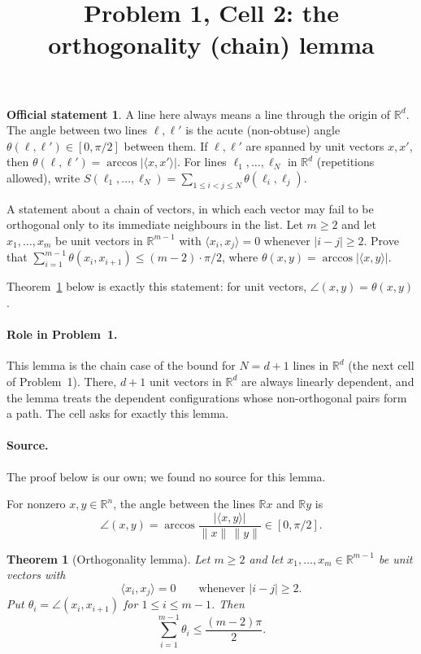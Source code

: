 \documentclass[11pt]{article}
\title{Problem 1, Cell 2: the orthogonality (chain) lemma}
\author{}
\date{}
\newtheorem{theorem}{Theorem}
\theoremstyle{remark}
\theoremstyle{definition}
\newtheorem*{statement}{Official statement}
\newcommand{\ip}[2]{\langle #1,#2\rangle}
\begin{document}
\maketitle

\begin{statement}
A line here always means a line through the origin of $\mathbb{R}^d$. The angle between two lines
$\ell,\ell'$ is the acute (non-obtuse) angle $\theta(\ell,\ell')\in[0,\pi/2]$ between them. If
$\ell,\ell'$ are spanned by unit vectors $x,x'$, then $\theta(\ell,\ell')=\arccos|\langle x,x'\rangle|$.
For lines $\ell_1,\dots,\ell_N$ in $\mathbb{R}^d$ (repetitions allowed), write
$S(\ell_1,\dots,\ell_N)=\sum_{1\le i<j\le N}\theta(\ell_i,\ell_j)$.

A statement about a chain of vectors, in which each vector may fail to be orthogonal only to its
immediate neighbours in the list. Let $m\ge2$ and let $x_1,\dots,x_m$ be unit vectors in
$\mathbb{R}^{m-1}$ with $\langle x_i,x_j\rangle=0$ whenever $|i-j|\ge2$. Prove that
$\sum_{i=1}^{m-1}\theta(x_i,x_{i+1})\le(m-2)\cdot\pi/2$, where $\theta(x,y)=\arccos|\langle x,y\rangle|$.
\end{statement}

\noindent Theorem~\ref{thm:main} below is exactly this statement: for unit vectors,
$\angle(x,y)=\theta(x,y)$.

\paragraph{Role in Problem~1.} This lemma is the chain case of the bound for $N=d+1$ lines in
$\mathbb{R}^d$ (the next cell of Problem~1). There, $d+1$ unit vectors in $\mathbb{R}^d$ are always
linearly dependent, and the lemma treats the dependent configurations whose non-orthogonal pairs
form a path. The cell asks for exactly this lemma.

\paragraph{Source.} The proof below is our own; we found no source for this lemma.

For nonzero $x,y\in\mathbb{R}^n$, the angle between the lines $\mathbb{R}x$ and $\mathbb{R}y$ is
\[
  \angle(x,y)=\arccos\frac{|\ip xy|}{\|x\|\,\|y\|}\in[0,\pi/2].
\]

\begin{theorem}[Orthogonality lemma]\label{thm:main}
Let $m\ge2$ and let $x_1,\dots,x_m\in\mathbb{R}^{m-1}$ be unit vectors with
\[
  \ip{x_i}{x_j}=0\qquad\text{whenever } |i-j|\ge2 .
\]
Put $\theta_i=\angle(x_i,x_{i+1})$ for $1\le i\le m-1$. Then
\[
  \sum_{i=1}^{m-1}\theta_i\le\frac{(m-2)\pi}{2}.
\]
\end{theorem}
\end{document}
